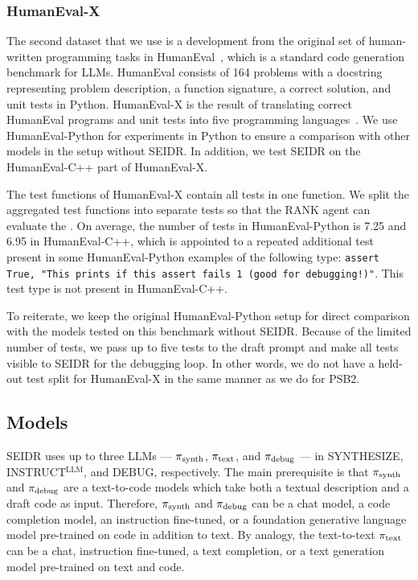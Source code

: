 \subsubsection{HumanEval-X}
The second dataset that we use is a development from the original set of human-written programming tasks in HumanEval~\cite{chenEvaluatingLargeLanguage2021}, which is a standard code generation benchmark for LLMs.
HumanEval consists of 164 problems with a docstring representing problem description, a function signature, a correct solution, and unit tests in Python. 
HumanEval-X is the result of translating correct HumanEval programs and unit tests into five programming languages~\cite{zheng2023:codegeex}. 
We use HumanEval-Python for experiments in Python to ensure a comparison with other models in the setup without SEIDR. 
In addition, we test SEIDR on the HumanEval-C++ part of HumanEval-X. %

The test functions of HumanEval-X contain all tests in one function. We split the aggregated test functions into separate tests so that the RANK agent can evaluate the . 
On average, the number of tests in HumanEval-Python is 7.25 and 6.95 in HumanEval-C++, which is appointed to a repeated additional test present in some HumanEval-Python examples of the following type: \texttt{assert True, "This prints if this assert fails 1 (good for debugging!)"}.
This test type is not present in HumanEval-C++.

To reiterate, we keep the original HumanEval-Python setup for direct comparison with the models tested on this benchmark without SEIDR. 
Because of the limited number of tests, we pass up to five tests to the draft prompt and make all tests visible to SEIDR for the debugging loop. 
In other words, we do not have a held-out test split for HumanEval-X in the same manner as we do for PSB2.


\subsection{Models}
\label{sec:seidr-models}

SEIDR uses up to three LLMs --- $ \pi_\text{synth} $, $ \pi_\text{text} $, and $ \pi_\text{debug} $ ---
in SYNTHESIZE, INSTRUCT$^{\text{LLM}}$, and DEBUG, respectively. 
The main prerequisite is that $ \pi_\text{synth} $ and $ \pi_\text{debug} $ are a text-to-code models which take both a textual description and a draft code as input.
Therefore, $ \pi_\text{synth} $ and $ \pi_\text{debug} $ can be a chat model, a code completion model, an instruction fine-tuned, or a foundation generative language model pre-trained on code in addition to text. 
By analogy, the text-to-text $ \pi_\text{text} $ can be a chat, instruction fine-tuned, a text completion, or a text generation model pre-trained on text and code.


